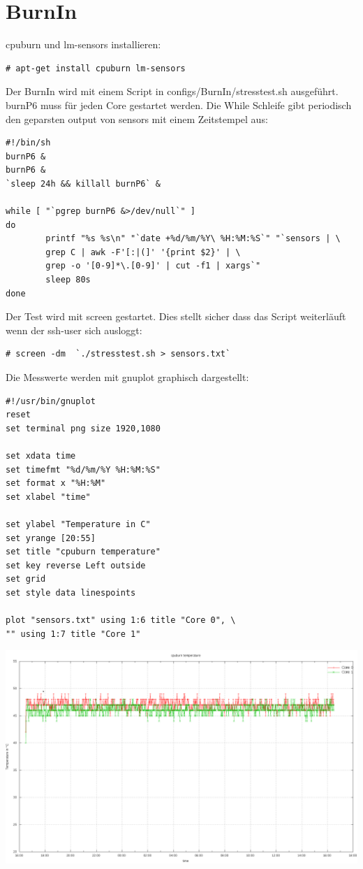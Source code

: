 \section{BurnIn}
cpuburn und lm-sensors installieren:
\begin{lstlisting}[style=Bash]
# apt-get install cpuburn lm-sensors
\end{lstlisting}
Der BurnIn wird mit einem Script in configs/BurnIn/stresstest.sh ausgeführt.\\
burnP6 muss für jeden Core gestartet werden. Die While Schleife gibt periodisch den geparsten output von sensors mit einem Zeitstempel aus:
\begin{lstlisting}[style=Bash]
#!/bin/sh
burnP6 &
burnP6 &
`sleep 24h && killall burnP6` &

while [ "`pgrep burnP6 &>/dev/null`" ]
do
        printf "%s %s\n" "`date +%d/%m/%Y\ %H:%M:%S`" "`sensors | \
		grep C | awk -F'[:|(]' '{print $2}' | \
		grep -o '[0-9]*\.[0-9]' | cut -f1 | xargs`"
        sleep 80s
done
\end{lstlisting}
Der Test wird mit screen gestartet. Dies stellt sicher dass das Script weiterläuft wenn der ssh-user sich ausloggt:
\begin{lstlisting}[style=Bash]
# screen -dm  `./stresstest.sh > sensors.txt`
\end{lstlisting}
Die Messwerte werden mit gnuplot graphisch dargestellt:
\begin{lstlisting}[style=Bash]
#!/usr/bin/gnuplot
reset
set terminal png size 1920,1080

set xdata time
set timefmt "%d/%m/%Y %H:%M:%S"
set format x "%H:%M"
set xlabel "time"

set ylabel "Temperature in C"
set yrange [20:55]
set title "cpuburn temperature"
set key reverse Left outside
set grid
set style data linespoints

plot "sensors.txt" using 1:6 title "Core 0", \
"" using 1:7 title "Core 1"
\end{lstlisting}
\includegraphics[width=\textwidth,height=\textheight,keepaspectratio]{../aufgabe1/BurnIn/plot.png}
